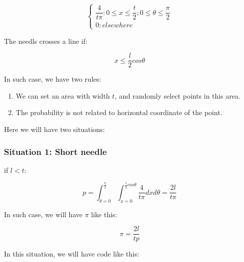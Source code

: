 \documentclass[]{article}
\begin{document}
\[\left\{
            \begin{array}{ll}
            \dfrac{4}{t \pi}: 0 \le x \le \dfrac{t}{2}; 0 \le \theta \le \dfrac{\pi}{2}\\
            0:elsewhere
            \end{array}
\right.\]

The needls crosses a line if:

\[x \le \frac{l}{2} cos\theta\]

In such case, we have two rules:

\begin{enumerate}
\def\labelenumi{(\arabic{enumi})}
\item
  We can set an area with width \(t\), and randomly select points in
  this area.
\item
  The probability is not related to horizontal coordinate of the point.
\end{enumerate}

Here we will have two situations:

\subsubsection{Situation 1: Short
needle}\label{situation-1-short-needle}

if \(l < t\):

\[p = \int_{\theta = 0}^\frac{\pi}{2} \int_{x = 0}^{\frac{l}{2}cos\theta} \frac{4}{t \pi} dx d\theta = \frac{2l}{t \pi}\]

In such case, we will have \(\pi\) like this:

\[\pi = \frac{2l}{tp}\]

In this situation, we will have code like this:
\end{document}
